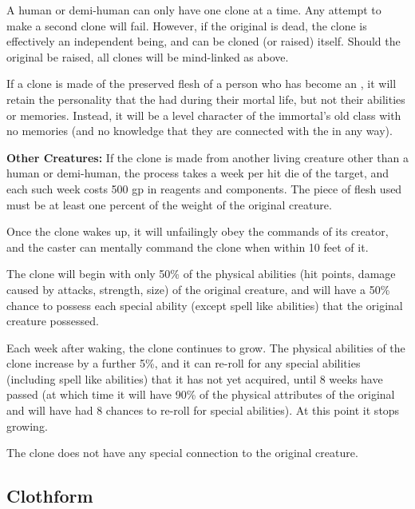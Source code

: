 \begin{multicols*}{2}
A human or demi-human can only have one clone at a time. Any attempt to make a second clone will fail. However, if the original is dead, the clone is effectively an independent being, and can be cloned (or raised) itself. Should the original be raised, all clones will be mind-linked as above.

If a clone is made of the preserved flesh of a person who has become an , it will retain the personality that the  had during their mortal life, but not their abilities or memories. Instead, it will be a  level character of the immortal’s old class with no memories (and no knowledge that they are connected with the  in any way).

\textbf{Other Creatures:} If the clone is made from another living creature other than a human or demi-human, the process takes a week per hit die of the target, and each such week costs 500 gp in reagents and components. The piece of flesh used must be at least one percent of the weight of the original creature.

Once the clone wakes up, it will unfailingly obey the commands of its creator, and the caster can mentally command the clone when within 10 feet of it.

The clone will begin with only 50\% of the physical abilities (hit points, damage caused by attacks, strength, size) of the original creature, and will have a 50\% chance to possess each special ability (except spell like abilities) that the original creature possessed.

Each week after waking, the clone continues to grow. The physical abilities of the clone increase by a further 5\%, and it can re-roll for any special abilities (including spell like abilities) that it has not yet acquired, until 8 weeks have passed (at which time it will have 90\% of the physical attributes of the original and will have had 8 chances to re-roll for special abilities). At this point it stops growing.

The clone does not have any special connection to the original creature.

\subsection{Clothform}\label{spell:Clothform}
\end{multicols*}

